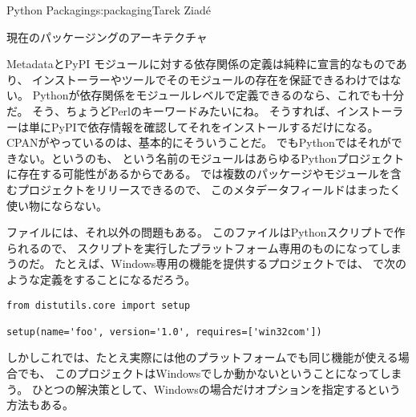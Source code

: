 \begin{aosachapter}{Python Packaging}{s:packaging}{Tarek Ziad\'{e}}
\begin{aosasect1}{現在のパッケージングのアーキテクチャ}
\begin{aosasect2}{MetadataとPyPI}
モジュールに対する依存関係の定義は純粋に宣言的なものであり、
インストーラーやツールでそのモジュールの存在を保証できるわけではない。
Pythonが依存関係をモジュールレベルで定義できるのなら、これでも十分だ。
そう、ちょうどPerlのキーワードみたいにね。
そうすれば、インストーラーは単にPyPIで依存情報を確認してそれをインストールするだけになる。
CPANがやっているのは、基本的にそういうことだ。
でもPythonではそれができない。というのも、
という名前のモジュールはあらゆるPythonプロジェクトに存在する可能性があるからである。
では複数のパッケージやモジュールを含むプロジェクトをリリースできるので、
このメタデータフィールドはまったく使い物にならない。

ファイルには、それ以外の問題もある。
このファイルはPythonスクリプトで作られるので、
スクリプトを実行したプラットフォーム専用のものになってしまうのだ。
たとえば、Windows専用の機能を提供するプロジェクトでは、
で次のような定義をすることになるだろう。

\begin{verbatim}
from distutils.core import setup

setup(name='foo', version='1.0', requires=['win32com'])
\end{verbatim}

\noindent
しかしこれでは、たとえ実際には他のプラットフォームでも同じ機能が使える場合でも、
このプロジェクトはWindowsでしか動かないということになってしまう。
ひとつの解決策として、Windowsの場合だけオプションを指定するという方法もある。


\end{aosasect2}
\end{aosasect1}
\end{aosachapter}
